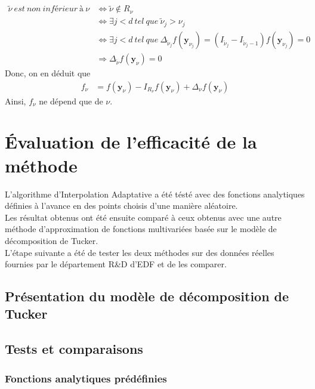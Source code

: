 \begin{align}
		\tilde{\nu}\ est\ non\ inférieur\ à\ \nu 		&	\Leftrightarrow \tilde{\nu} \notin R_{\nu} \\ \nonumber
																								&	\Leftrightarrow \exists j<d\ tel\ que\ \tilde{\nu}_j > \nu_j \\ \nonumber
																								&	\Leftrightarrow \exists j<d\ tel\ que\ \Delta_{\tilde{\nu}_j} f(\textbf{y}_{\nu_j}) = (I_{\tilde{\nu}_j} - I_{\tilde{\nu}_j-1}) f(\textbf{y}_{\nu_j}) = 0\\ \nonumber
																								&	\Rightarrow \Delta_{\tilde{\nu}} f(\textbf{y}_{\nu}) = 0 \nonumber
\end{align}
Donc, on en déduit que
\begin{align}
		f_{\nu} &= f(\textbf{y}_{\nu}) - I_{R_{\nu}}f(\textbf{y}_{\nu}) + \Delta_{\nu}f(\textbf{y}_{\nu}) \nonumber
\end{align}
Ainsi, $f_{\nu}$ ne dépend que de $\nu$.

\section{Évaluation de l’efficacité de la méthode}\label{sec:6}
L'algorithme d'Interpolation Adaptative a été tésté avec des fonctions analytiques définies à l'avance en des points choisis d'une manière aléatoire.\\
Les résultat obtenus ont été ensuite comparé à ceux obtenus avec une autre méthode d'approximation de fonctions multivariées basée sur
le modèle de décomposition de Tucker.\\
L'étape suivante a été de tester les deux méthodes sur des données réelles fournies par le département R\&D d'EDF et de les comparer.

\subsection{Présentation du modèle de décomposition de Tucker}
\subsection{Tests et comparaisons}
\subsubsection{Fonctions analytiques prédéfinies}
